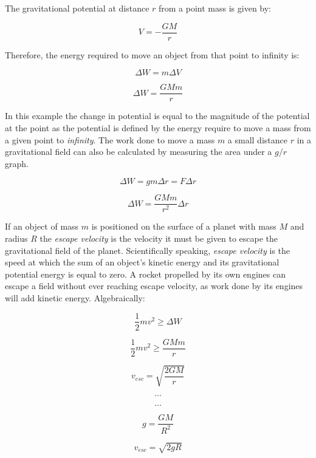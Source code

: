 \documentclass[12pt]{article}
\begin{document}
The gravitational potential at distance \(r\) from a point mass is given by:

\[V = - \dfrac{GM}{r}\]

Therefore, the energy required to move an object from that point to infinity is:

\[\Delta W = m \Delta V\]

\[\Delta W = \dfrac{GMm}{r} \]

In this example the change in potential is equal to the magnitude of the potential at the point as the potential is defined by the energy require to move a mass from a given point to \emph{infinity}. The work done to move a mass \(m\) a small distance \(r\) in a gravitational field can also be calculated by measuring the area under a \(g/r\) graph.

\[\Delta W = gm \Delta r = F \Delta r  \]

\[ \Delta W = \dfrac{GMm}{r^2} \Delta r \]

If an object of mass \(m\) is positioned on the surface of a planet with mass \(M\) and radius \(R\) the \emph{escape velocity} is the velocity it must be given to escape the gravitational field of the planet. Scientifically speaking, \emph{escape velocity} is the speed at which the sum of an object's kinetic energy and its gravitational potential energy is equal to zero. A rocket propelled by its own engines can escape a field without ever reaching escape velocity, as work done by its engines will add kinetic energy. Algebraically:

\begin{figure}[H]
\centering
\begin{minipage}{.8\textwidth}
\begin{tcolorbox}[
sharp corners=all,
colback=white,
colframe=white,
size=tight,
boxrule=0.2mm,
left=10mm, right=10mm
]
\begin{multicols}{2}
\noindent

\[\dfrac{1}{2} m v^2 \ge \Delta W\]

\[\dfrac{1}{2} m v^2 \ge \dfrac{GMm}{r}\]

\[ v_{esc} = \sqrt{\dfrac{2GM}{r}}\]

\[\textbf{\ldots}\]
\columnbreak


\[\textbf{\ldots}\]

\[g = \dfrac{GM}{R^2}\]

\[ v_{esc} = \sqrt{2gR}\]
\\

\end{multicols}
\end{tcolorbox}
\end{minipage}
\end{figure}
\end{document}
